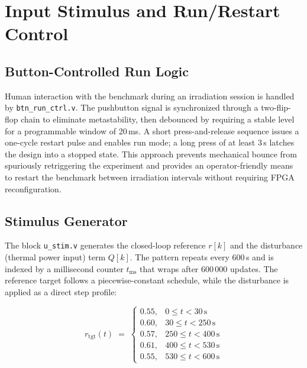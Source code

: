 \section{Input Stimulus and Run/Restart Control}
\label{sec:bench_stimulus}

\subsection{Button-Controlled Run Logic}
\label{ssec:bench_button}

Human interaction with the benchmark during an irradiation session is
handled by \texttt{btn\_run\_ctrl.v}.  The pushbutton signal is
synchronized through a two-flip-flop chain to eliminate metastability,
then debounced by requiring a stable level for a programmable window of
20\,ms.  A short press-and-release sequence issues a one-cycle restart
pulse and enables run mode; a long press of at least 3\,s latches the
design into a stopped state.  This approach prevents mechanical bounce
from spuriously retriggering the experiment and provides an
operator-friendly means to restart the benchmark between irradiation
intervals without requiring FPGA reconfiguration.

\subsection{Stimulus Generator}
\label{ssec:bench_stim_gen}

The block \texttt{u\_stim.v} generates the closed-loop reference $r[k]$
and the disturbance (thermal power input) term $Q[k]$.  The pattern
repeats every 600\,s and is indexed by a millisecond counter
$t_{\mathrm{ms}}$ that wraps after 600\,000 updates.  The reference
target follows a piecewise-constant schedule, while the disturbance is
applied as a direct step profile:

\begin{equation}
  r_{\mathrm{tgt}}(t) \;=\;
  \begin{cases}
    0.55, & 0 \le t < 30\,\mathrm{s} \\
    0.60, & 30 \le t < 250\,\mathrm{s} \\
    0.57, & 250 \le t < 400\,\mathrm{s} \\
    0.61, & 400 \le t < 530\,\mathrm{s} \\
    0.55, & 530 \le t < 600\,\mathrm{s}
  \end{cases}
  \label{eq:r_tgt}
\end{equation}

